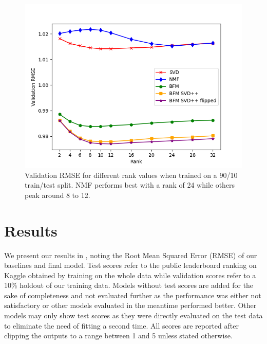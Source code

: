 \documentclass[10pt,conference,compsocconf]{IEEEtran}
\begin{document}
    \begin{figure}
        \includegraphics[width=\columnwidth]{figures/rank.png}
        \caption{Validation RMSE for different rank values when trained on a 90/10 train/test split.
        NMF performs best with a rank of 24 while others peak around 8 to 12.}
        \label{fig:rank}
    \end{figure}


    \section{Results}
    We present our results in , noting the Root Mean Squared Error (RMSE) of our baselines and final model.
    Test scores refer to the public leaderboard ranking on Kaggle obtained by training on the whole data while validation scores refer to a 10\% holdout of our training data.
    Models without test scores are added for the sake of completeness and not evaluated further as the performance was either not satisfactory or other models evaluated in the meantime performed better.
    Other models may only show test scores as they were directly evaluated on the test data to eliminate the need of
    fitting a second time. All scores are reported after clipping the outputs to a range between 1 and 5 unless stated otherwise.
\end{document}
